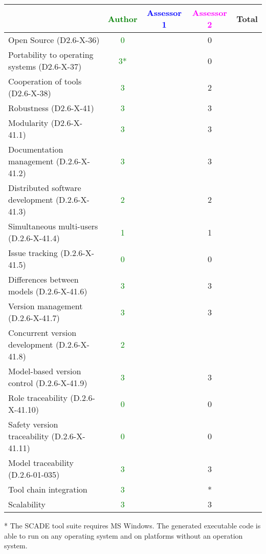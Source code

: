 \begin{tabular}{|l | c | c | c | c|}
\hline
& \textcolor{green}{Author} & \textcolor{blue}{Assessor 1} & \textcolor{magenta}{Assessor 2} & Total \\
\hline 
Open Source (D2.6-X-36) &  \textcolor{green}{0}& &0 &  \\
\hline 
Portability to operating systems (D2.6-X-37) &  \textcolor{green}{3*}& &0 &  \\
\hline
Cooperation of tools (D2.6-X-38) &  \textcolor{green}{3}& &2 &  \\
\hline
Robustness (D2.6-X-41) &  \textcolor{green}{3}& &3 & \\
\hline
Modularity (D2.6-X-41.1) &  \textcolor{green}{3}& &3 & \\
\hline
Documentation management (D.2.6-X-41.2) &  \textcolor{green}{3}& &3 & \\
\hline
Distributed software development (D.2.6-X-41.3)  &  \textcolor{green}{2}& &2 & \\
\hline
Simultaneous multi-users (D.2.6-X-41.4)   &  \textcolor{green}{1}& &1 & \\
\hline
Issue tracking (D.2.6-X-41.5) &  \textcolor{green}{0}& &0 & \\
\hline
Differences between models (D.2.6-X-41.6) &  \textcolor{green}{3}& &3 & \\
\hline
Version management (D.2.6-X-41.7) &  \textcolor{green}{3}& &3 & \\
\hline
Concurrent version development (D.2.6-X-41.8) &  \textcolor{green}{2}& & & \\
\hline
Model-based version control (D.2.6-X-41.9) &  \textcolor{green}{3}& &3 & \\
\hline
Role traceability (D.2.6-X-41.10) &  \textcolor{green}{0}& &0 & \\
\hline
Safety version traceability (D.2.6-X-41.11) &  \textcolor{green}{0}& &0 & \\
\hline
Model traceability (D.2.6-01-035) & \textcolor{green}{3} & &3 & \\
\hline
Tool chain integration & \textcolor{green}{3} & &* & \\
\hline
Scalability & \textcolor{green}{3} & &3 & \\
\hline
\end{tabular}

\begin{author_comment}
* The SCADE tool suite requires MS Windows. The generated executable code is able to run on any operating system and on platforms without an operation system.   
\end{author_comment}

